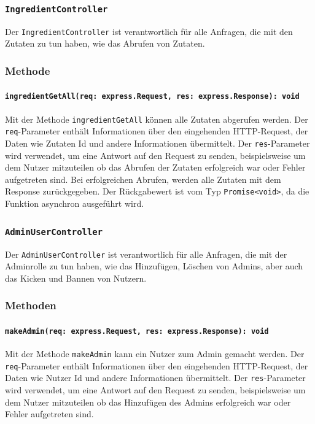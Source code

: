 \documentclass{entwurfsheft}
\begin{document}
\subsubsection{\texttt{IngredientController}}\label{sec:IngredientController}
Der \texttt{IngredientController} ist verantwortlich für alle Anfragen, die mit den Zutaten zu tun haben, wie das Abrufen von Zutaten.
\subsubsection*{Methode}
\paragraph{\texttt{ingredientGetAll(req: express.Request, res: express.Response): void}}
Mit der Methode \texttt{ingredientGetAll} können alle Zutaten abgerufen werden. Der \texttt{req}-Parameter enthält Informationen über den eingehenden HTTP-Request, der Daten wie Zutaten Id und andere Informationen übermittelt. Der \texttt{res}-Parameter wird verwendet, um eine Antwort auf den Request zu senden, beispielsweise um dem Nutzer mitzuteilen ob das Abrufen der Zutaten erfolgreich war oder Fehler aufgetreten sind. Bei erfolgreichen Abrufen, werden alle Zutaten mit dem Response zurückgegeben.
Der Rückgabewert ist vom Typ \texttt{Promise<void>}, da die Funktion asynchron ausgeführt wird.

\subsubsection{\texttt{AdminUserController}}\label{sec:AdminUserController}
Der \texttt{AdminUserController} ist verantwortlich für alle Anfragen, die mit der Adminrolle zu tun haben, wie das Hinzufügen, Löschen von Admins, aber auch das Kicken und Bannen von Nutzern.
\subsubsection*{Methoden}
\paragraph{\texttt{makeAdmin(req: express.Request, res: express.Response): void}}
Mit der Methode \texttt{makeAdmin} kann ein Nutzer zum Admin gemacht werden. Der \texttt{req}-Parameter enthält Informationen über den eingehenden HTTP-Request, der Daten wie Nutzer Id und andere Informationen übermittelt. Der \texttt{res}-Parameter wird verwendet, um eine Antwort auf den Request zu senden, beispielsweise um dem Nutzer mitzuteilen ob das Hinzufügen des Admins erfolgreich war oder Fehler aufgetreten sind.
\end{document}
